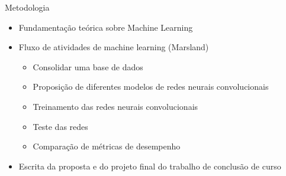 \begin{frame}{Metodologia}
   \ \  \\[0.1cm]
  \begin{itemize}
  \item Fundamentação teórica sobre Machine Learning
  \item Fluxo de atividades de machine learning (Marsland)
  \begin{itemize}
    \item Consolidar uma base de dados
    \item Proposição de diferentes modelos de redes neurais convolucionais
    \item Treinamento das redes neurais convolucionais
    \item Teste das redes
    \item Comparação de métricas de desempenho
  \end{itemize}
  \item Escrita da proposta e do projeto final do trabalho de conclusão de curso
\end{itemize}
\end{frame}

